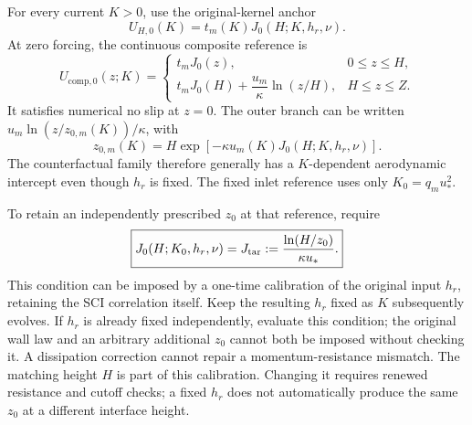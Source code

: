 \documentclass[11pt,a4paper]{article}
\numberwithin{equation}{section}
\newcommand{\ust}{u_*}
\begin{document}
For every current $K>0$, use the original-kernel anchor
\begin{equation}
 \boxed{U_{H,0}(K)=t_m(K)J_0(H;K,h_r,\nu).}
 \label{awf:anchor-identity}
\end{equation}
At zero forcing, the continuous composite reference is
\begin{equation}
 U_{\mathrm{comp},0}(z;K)=
 \begin{cases}
 t_mJ_0(z),&0\leq z\leq H,\\[1mm]
 t_mJ_0(H)+\dfrac{u_m}{\kappa}\ln(z/H),&H\leq z\leq Z .
 \end{cases}
 \label{awf:composite-velocity}
\end{equation}
It satisfies numerical no slip at $z=0$. The outer branch can be
written $u_m\ln(z/z_{0,m}(K))/\kappa$, with
\begin{equation}
 \boxed{z_{0,m}(K)=H\exp[-\kappa u_m(K)J_0(H;K,h_r,\nu)].}
 \label{awf:generated-roughness}
\end{equation}
The counterfactual family therefore generally has a $K$-dependent
aerodynamic intercept even though $h_r$ is fixed. The fixed inlet
reference uses only $K_0=q_m\ust^2$.

To retain an independently prescribed $z_0$ at that reference,
require
\begin{equation}
 \boxed{
 J_0(H;K_0,h_r,\nu)
 =J_{\rm tar}:=\frac{\ln(H/z_0)}{\kappa\ust}.
 }
 \label{awf:roughness-compatibility}
\end{equation}
This condition can be imposed by a one-time calibration of the
original input $h_r$, retaining the SCI correlation itself. Keep
the resulting $h_r$ fixed as $K$ subsequently evolves. If $h_r$ is
already fixed independently, evaluate this condition; the original
wall law and an arbitrary additional $z_0$ cannot both be imposed
without checking it. A dissipation correction cannot repair a
momentum-resistance mismatch.
The matching height $H$ is part of this calibration. Changing it
requires renewed resistance and cutoff checks; a fixed $h_r$ does
not automatically produce the same $z_0$ at a different interface
height.
\end{document}

